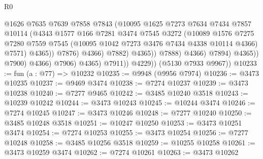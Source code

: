\begin{lexlean}{R0}
\begin{coremodule}
                                          @1626
                                          @7635
                                          @7639
                                          @7858
                                          @7843
                                          (@10095
                                            @1625
                                            @7273
                                            @7634
                                            @7434
                                            @7857
                                            @10114
                                            (@4343
                                              @1577
                                              @166
                                              @7281
                                              @3474
                                              @7545
                                              @3272
                                              (@10089
                                                @1576
                                                @7275
                                                @7280
                                                @7559
                                                @7545
                                                (@10095 @1042 @7273 @3476 @7434 @4338 @10114 @4366)
                                                @7571)
                                              @4365))
                                          @7876)
                                        @4366)
                                      @7882)
                                    @4365))
                                @7888)
                              @4366)
                            @7894)
                          @4365))
                      @7900)
                    @4366)
                  @7906)
                @4365)
              @7911))
          @4229))
      (@5130 @7933 @9967))
@10233 := fun (a : @77) => @10232
@10235 := @9948 (@9956 @7974)
@10236 := @3473 @10235
@10237 := @9469 @3474
@10238 := @7274 @10237
@10239 := @3473 @10238
@10240 := @7277 @9465
@10242 := @3485 @10240 @3518
@10243 := @10239 @10242
@10244 := @3473 @10243
@10245 := @10244 @3474
@10246 := @7274 @10245
@10247 := @3473 @10246
@10248 := @7277 @10240
@10250 := @3485 @10248 @3518
@10251 := @10247 @10250
@10253 := @3473 @10251 @3474
@10254 := @7274 @10253
@10255 := @3473 @10254
@10256 := @7277 @10248
@10258 := @3485 @10256 @3518
@10259 := @10255 @10258
@10261 := @3473 @10259 @3474
@10262 := @7274 @10261
@10263 := @3473 @10262

\end{coremodule}
\end{lexlean}

